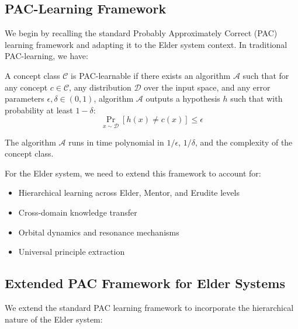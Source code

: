 \subsection{PAC-Learning Framework}

We begin by recalling the standard Probably Approximately Correct (PAC) learning framework and adapting it to the Elder system context. In traditional PAC-learning, we have:

\begin{definition}
A concept class $\mathcal{C}$ is PAC-learnable if there exists an algorithm $\mathcal{A}$ such that for any concept $c \in \mathcal{C}$, any distribution $\mathcal{D}$ over the input space, and any error parameters $\epsilon, \delta \in (0, 1)$, algorithm $\mathcal{A}$ outputs a hypothesis $h$ such that with probability at least $1 - \delta$:
\begin{equation}
\Pr_{x \sim \mathcal{D}}[h(x) \neq c(x)] \leq \epsilon
\end{equation}

The algorithm $\mathcal{A}$ runs in time polynomial in $1/\epsilon$, $1/\delta$, and the complexity of the concept class.
\end{definition}

For the Elder system, we need to extend this framework to account for:
\begin{itemize}
    \item Hierarchical learning across Elder, Mentor, and Erudite levels
    \item Cross-domain knowledge transfer
    \item Orbital dynamics and resonance mechanisms
    \item Universal principle extraction
\end{itemize}

\subsection{Extended PAC Framework for Elder Systems}

We extend the standard PAC learning framework to incorporate the hierarchical nature of the Elder system:



